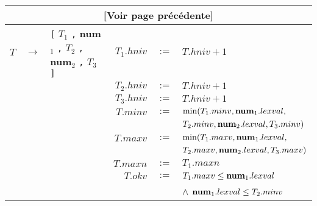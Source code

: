 \documentclass[class=article]{standalone}
\begin{document}
{
  \hspace{-2cm}
  \begin{tabular}{|rcl|rcl|}
    \hline
    \multicolumn{6}{|c|}{[Voir page précédente]} \\
    \hline
    \hline
    $T$ & $\rightarrow$ & \lstinline[]$[$ $T_1$ \lstinline[]$,$ {\bf num$_1$} \lstinline[]$,$  $T_2$ \lstinline[]$,$ {\bf num$_2$} \lstinline[]$,$ $T_3$ \lstinline[]$]$  & $T_1.hniv$ & $:=$ & $T.hniv + 1$ \\
        &               &                                                                                                                                                 & $T_2.hniv$ & $:=$ & $T.hniv + 1$\\
        &               &                                                                                                                                                 & $T_3.hniv$ & $:=$ & $T.hniv + 1$\\
        &               &                                                                                                                                                 & $T.minv$  & $:=$ & $\min(T_1.minv, {\bf num}_1.lexval,$\\
        &               &                                                                                                                                                 &           &      & $T_2.minv, {\bf num}_2.lexval, T_3.minv)$\\
        &               &                                                                                                                                                 & $T.maxv$  & $:=$ & $\min(T_1.maxv, {\bf num}_1.lexval,$\\
        &               &                                                                                                                                                 &           &      & $T_2.maxv, {\bf num}_2.lexval, T_3.maxv)$\\
        &               &                                                                                                                                                 & $T.maxn$  & $:=$ & $T_1.maxn$\\
        &               &                                                                                                                                                 & $T.okv$   & $:=$ & $T_1.maxv \leq {\bf num}_1.lexval$\\
        &               &                                                                                                                                                 &           &      & $\wedge$ ${\bf num}_1.lexval \leq T_2.minv$\\

\end{tabular}}
\end{document}
